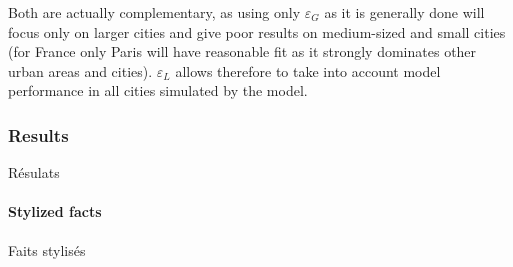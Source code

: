 Both are actually complementary, as using only $\varepsilon_G$ as it is generally done will focus only on larger cities and give poor results on medium-sized and small cities (for France only Paris will have reasonable fit as it strongly dominates other urban areas and cities). $\varepsilon_L$ allows therefore to take into account model performance in all cities simulated by the model.








\subsubsection{Results}{Résulats}



\paragraph{Stylized facts}{Faits stylisés}


